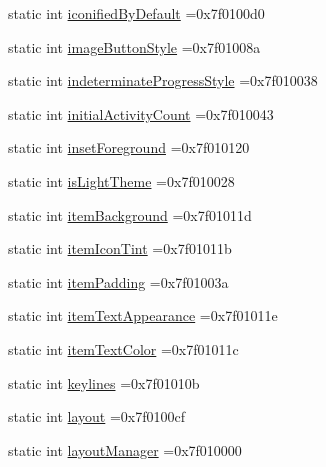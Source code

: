 \begin{DoxyCompactItemize}
\item 
static int \hyperlink{classandroid_1_1support_1_1v7_1_1cardview_1_1R_1_1attr_ad2576cb78d3d6f4a5f43cedbd9214143}{iconified\+By\+Default} =0x7f0100d0
\item 
static int \hyperlink{classandroid_1_1support_1_1v7_1_1cardview_1_1R_1_1attr_a36e9cbb5329e25be31dcb0c96046568d}{image\+Button\+Style} =0x7f01008a
\item 
static int \hyperlink{classandroid_1_1support_1_1v7_1_1cardview_1_1R_1_1attr_a001418b7a674dd9d6eb9d1bf296281ea}{indeterminate\+Progress\+Style} =0x7f010038
\item 
static int \hyperlink{classandroid_1_1support_1_1v7_1_1cardview_1_1R_1_1attr_a07815f7ffc1978c1f82a1ae4a03e0c80}{initial\+Activity\+Count} =0x7f010043
\item 
static int \hyperlink{classandroid_1_1support_1_1v7_1_1cardview_1_1R_1_1attr_a95795ef97b87d63d0925b2729ce66ec9}{inset\+Foreground} =0x7f010120
\item 
static int \hyperlink{classandroid_1_1support_1_1v7_1_1cardview_1_1R_1_1attr_a07f175e99544ab14cf32d417a53d9957}{is\+Light\+Theme} =0x7f010028
\item 
static int \hyperlink{classandroid_1_1support_1_1v7_1_1cardview_1_1R_1_1attr_ad7f63c9a2a7d13b6e12c2e94acd31e05}{item\+Background} =0x7f01011d
\item 
static int \hyperlink{classandroid_1_1support_1_1v7_1_1cardview_1_1R_1_1attr_a1a956cf2559faa64461061b13883f806}{item\+Icon\+Tint} =0x7f01011b
\item 
static int \hyperlink{classandroid_1_1support_1_1v7_1_1cardview_1_1R_1_1attr_a0d99f47cfd454bbcb9277b6e3440c206}{item\+Padding} =0x7f01003a
\item 
static int \hyperlink{classandroid_1_1support_1_1v7_1_1cardview_1_1R_1_1attr_abfcdf49cb02e19d0dd2116941f919c40}{item\+Text\+Appearance} =0x7f01011e
\item 
static int \hyperlink{classandroid_1_1support_1_1v7_1_1cardview_1_1R_1_1attr_a178b859ac1d854093896f5a61d0f5dbf}{item\+Text\+Color} =0x7f01011c
\item 
static int \hyperlink{classandroid_1_1support_1_1v7_1_1cardview_1_1R_1_1attr_ac25bc2cb240f07022d238edbb304cc92}{keylines} =0x7f01010b
\item 
static int \hyperlink{classandroid_1_1support_1_1v7_1_1cardview_1_1R_1_1attr_a09b0bc987f2c5c9dac332b3eea8b0493}{layout} =0x7f0100cf
\item 
static int \hyperlink{classandroid_1_1support_1_1v7_1_1cardview_1_1R_1_1attr_a7c0556c8a91bf157017e4ec44e5126ab}{layout\+Manager} =0x7f010000

\end{DoxyCompactItemize}
